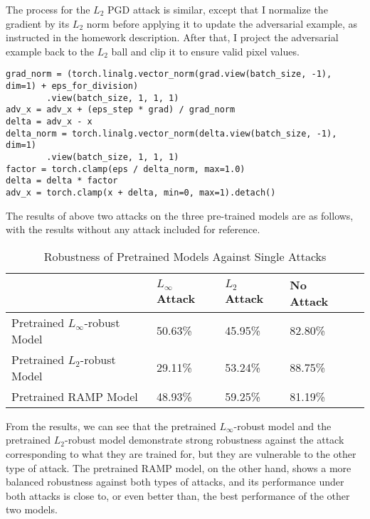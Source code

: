 \documentclass[10pt]{article}
\begin{document}
The process for the $L_2$ PGD attack is similar, except that I normalize the gradient by its $L_2$ norm before applying it to update the adversarial example, as instructed in the homework description. After that, I project the adversarial example back to the $L_2$ ball and clip it to ensure valid pixel values.

\begin{Verbatim}[frame=single]
grad_norm = (torch.linalg.vector_norm(grad.view(batch_size, -1), dim=1) + eps_for_division)
        .view(batch_size, 1, 1, 1)
adv_x = adv_x + (eps_step * grad) / grad_norm
delta = adv_x - x
delta_norm = torch.linalg.vector_norm(delta.view(batch_size, -1), dim=1)
        .view(batch_size, 1, 1, 1)
factor = torch.clamp(eps / delta_norm, max=1.0)
delta = delta * factor
adv_x = torch.clamp(x + delta, min=0, max=1).detach()
\end{Verbatim}

The results of above two attacks on the three pre-trained models are as follows, with the results without any attack included for reference.

\begin{table}[htbp]
\begin{tabularx}{\textwidth}{|>{\hsize=2\hsize}X|X|X|X|X|}
\hline
                                   & $L_\infty$ Attack & $L_2$ Attack & No Attack \\ \hline
Pretrained $L_\infty$-robust Model & 50.63\%           & 45.95\%      & 82.80\%   \\ \hline
Pretrained $L_2$-robust Model      & 29.11\%           & 53.24\%      & 88.75\%   \\ \hline
Pretrained RAMP Model              & 48.93\%           & 59.25\%      & 81.19\%   \\ \hline
\end{tabularx}
\caption{Robustness of Pretrained Models Against Single Attacks}
\label{tab:robustness_comparison}
\end{table}

From the results, we can see that the pretrained $L_\infty$-robust model and the pretrained $L_2$-robust model demonstrate strong robustness against the attack corresponding to what they are trained for, but they are vulnerable to the other type of attack. The pretrained RAMP model, on the other hand, shows a more balanced robustness against both types of attacks, and its performance under both attacks is close to, or even better than, the best performance of the other two models.


\newpage
\end{document}
